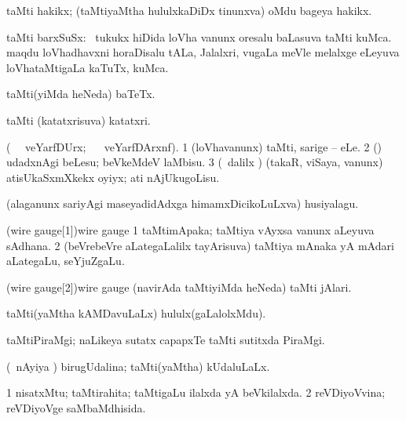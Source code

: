 \bentry
{}
\gl{\nA}
\bmng
taMti hakikx; (taMtiyaMtha hululxkaDiDx tinunxva) oMdu bageya hakikx. 
\emng
\eentry

\bentry
{}
\gl{\nA}
\bmng
taMti barxSuSx: 
\banum
{} \kanmu\ tukukx hiDida loVha \mo vanunx oresalu baLasuva taMti kuMca. 
 maqdu loVhadhavxni horaDisalu tALa, Jalalxri, \mo vugaLa meVle melalxge eLeyuva loVhataMtigaLa kaTuTx, kuMca. 
\eanum
\emng
\eentry

\bentry
{}
\gl{\nA}
\bmng
taMti(yiMda heNeda) baTeTx. 
\emng
\eentry

\bentry
{}
\gl{\nA}
\bmng
taMti (katatxrisuva) katatxri. 
\emng
\eentry

\bentry
{}
\gl{\sakirx} (\BU\  \ucAcx\ veYarfDUrx; \BUkaq\  \ucAcx\ veYarfDArxnf).
\bmng
\bnum
\num{1} (loVhavanunx) taMti, sarige -- eLe. 
\num{2} (\rUpa) udadxnAgi beLesu; beVkeMdeV laMbisu. 
\num{3} (\kanmu\ \BUkaq dalilx \parx) (takaR, viSaya, \mo vanunx) atisUkaSxmXkekx oyiyx; ati nAjUkugoLisu. 
\enum
\emng
\eentry

\bentry
{}
\gl{\nA}
\bmng
(alaganunx sariyAgi maseyadidAdxga himamxDicikoLuLxva) husiyalagu. 
\emng
\eentry

\bentry
\word(wire gauge[1]){wire gauge}
\gl{\nA}
\bmng
\bnum
\num{1} taMtimApaka; taMtiya vAyxsa \mo vanunx aLeyuva sAdhana. 
\num{2} (beVrebeVre aLategaLalilx tayArisuva) taMtiya mAnaka yA mAdari aLategaLu, seYjuZgaLu. 
\enum
\emng
\eentry

\bentry
\word(wire gauge[2]){wire gauge}
\gl{\nA}
\bmng
(navirAda taMtiyiMda heNeda) taMti jAlari. 
\emng
\eentry

\bentry
{}
\gl{\nA}
\bmng
taMti(yaMtha kAMDavuLaLx) hululx(gaLalolxMdu). 
\emng
\eentry

\bentry
{}
\gl{\nA}
\bmng
taMtiPiraMgi; naLikeya sutatx capapxTe taMti sutitxda PiraMgi. 
\emng
\eentry

\bentry
{}
\gl{\gu}
\bmng
(\kanmu\ nAyiya \vi) birugUdalina; taMti(yaMtha) kUdaluLaLx. 
\emng
\eentry

\bentry
{} 
\gl{\gu}
\expl{}
\bmng
\bnum
\num{1} nisatxMtu; taMtirahita; taMtigaLu ilalxda yA beVkilalxda. 
\num{2} reVDiyoVvina; reVDiyoVge saMbaMdhisida. 
\enum
\emng
\eentry

